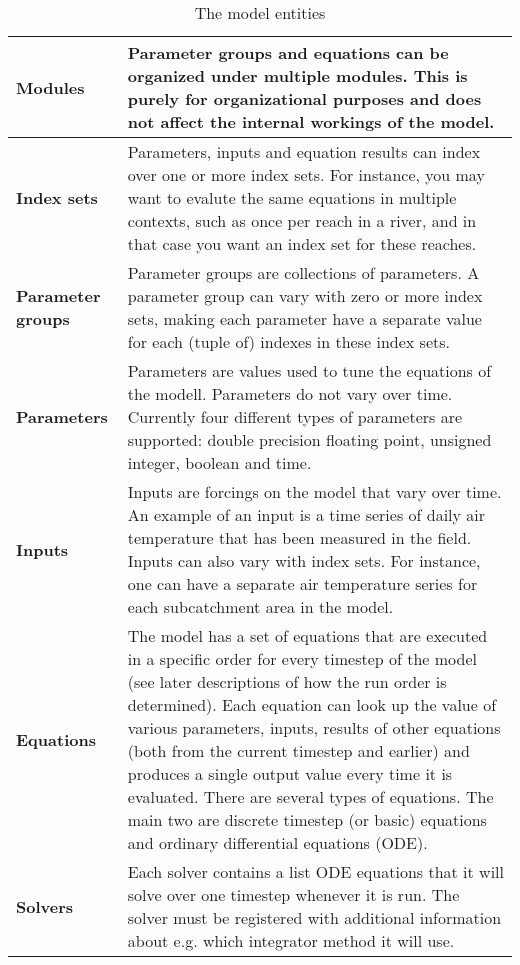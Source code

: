 \documentclass[11pt]{article}
\theoremstyle{definition}
\begin{document}
\begin{table}[H]
\centering
\begin{tabular}{|>{\bf}l|p{10cm} |}
\hline
Modules & Parameter groups and equations can be organized under multiple modules. This is purely for organizational purposes and does not affect the internal workings of the model.\\
\hline
Index sets & Parameters, inputs and equation results can index over one or more index sets. For instance, you may want to evalute the same equations in multiple contexts, such as once per reach in a river, and in that case you want an index set for these reaches. \\
\hline
Parameter groups & Parameter groups are collections of parameters. A parameter group can vary with zero or more index sets, making each parameter have a separate value for each (tuple of) indexes in these index sets. \\
\hline
Parameters & Parameters are values used to tune the equations of the modell. Parameters do not vary over time. Currently four different types of parameters are supported: double precision floating point, unsigned integer, boolean and time. \\
\hline
Inputs & Inputs are forcings on the model that vary over time. An example of an input is a time series of daily air temperature that has been measured in the field. Inputs can also vary with index sets. For instance, one can have a separate air temperature series for each subcatchment area in the model.\\
\hline
Equations & The model has a set of equations that are executed in a specific order for every timestep of the model (see later descriptions of how the run order is determined). Each equation can look up the value of various parameters, inputs, results of other equations (both from the current timestep and earlier) and produces a single output value every time it is evaluated. There are several types of equations. The main two are discrete timestep (or basic) equations and ordinary differential equations (ODE). \\
\hline
Solvers & Each solver contains a list ODE equations that it will solve over one timestep whenever it is run. The solver must be registered with additional information about e.g. which integrator method it will use. \\
\hline
\end{tabular}
\caption{The model entities}
\label{tab:modelentity}
\end{table}
\end{document}
